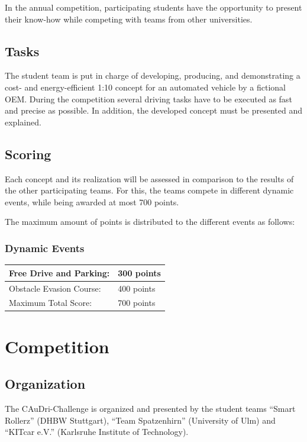 \documentclass[a4paper]{report}
\begin{document}
In the annual competition, participating students have the opportunity to present their know-how while competing with teams from other universities. 

\section{Tasks}

The student team is put in charge of developing, producing, and demonstrating a cost- and energy-efficient 1:10 concept for an automated vehicle by a fictional OEM. During the competition several driving tasks have to be executed as fast and precise as possible. In addition, the developed concept must be presented and explained. 

\section{Scoring}

Each concept and its realization will be assessed in comparison to the results of the other participating teams. For this, the teams compete in diﬀerent dynamic events, while being awarded at most 700 points. 

The maximum amount of points is distributed to the diﬀerent events as follows: 

\subsection{Dynamic Events}

\begin{table}[h]
\begin{tabular}{|l|l|}
\hline
Free Drive and Parking:  & 300 points \\ \hline
Obstacle Evasion Course: & 400 points \\ \hline\hline
Maximum Total Score:     & 700 points \\ \hline
\end{tabular}
\end{table}

\chapter{Competition}

\section{Organization}

The CAuDri-Challenge is organized and presented by the student teams “Smart Rollerz” (DHBW Stuttgart), “Team Spatzenhirn” (University of Ulm) and “KITcar e.V.” (Karlsruhe Institute of Technology). 
\end{document}
